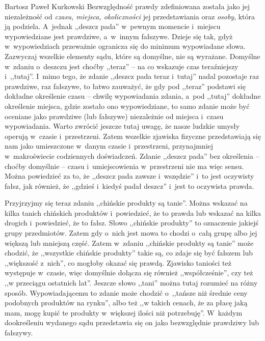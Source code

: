 \begin{artplenv}{Bartosz Paweł Kurkowski}
Bezwzględność prawdy zdefiniowana została jako jej niezależność od \textit{czasu, miejsca, okoliczności} jej
przedstawiania oraz \textit{osoby}, która ją podziela. A~jednak ,,deszcz pada'' w~pewnym momencie i~miejscu wypowiedziane
jest prawdziwe, a~w~innym fałszywe. Dzieje się tak, gdyż w~wypowiedziach przeważnie ogranicza się do minimum
wypowiadane słowa. Zazwyczaj wszelkie elementy sądu, które są domyślne, nie są wyrażane. Domyślne w~zdaniu o~deszczu
jest choćby ,,teraz'' -- na co wskazuje czas teraźniejszy i~,,tutaj''. I~mimo tego, że zdanie ,,deszcz pada teraz i~tutaj''
nadal pozostaje raz prawdziwe, raz fałszywe, to łatwo zauważyć, że gdy pod ,,teraz'' podstawi się dokładne określenie
czasu -- chwilę wypowiadania zdania, a~pod ,,tutaj'' dokładne określenie miejsca, gdzie zostało ono wypowiedziane, to samo
zdanie może być oceniane jako prawdziwe (lub fałszywe) niezależnie od miejsca i~czasu wypowiadania. Warto zwrócić
jeszcze tutaj uwagę, że nasze ludzkie umysły operują w~czasie i~przestrzeni. Zatem wszelkie zjawiska fizyczne
przedstawiają się nam jako umieszczone w~danym czasie i~przestrzeni, przynajmniej w~makroświecie codziennych
doświadczeń. Zdanie ,,deszcz pada'' bez określenia -- choćby domyślnie -- czasu i~umiejscowienia w~przestrzeni nie ma więc
sensu. Można powiedzieć za to, że ,,deszcz pada zawsze i~wszędzie'' i~to jest oczywisty fałsz, jak również, że ,,gdzieś
i~kiedyś padał deszcz'' i~jest to oczywista prawda.


Przyjrzyjmy się teraz zdaniu ,,chińskie produkty są tanie''. Można wskazać na kilka tanich chińskich
produktów i~powiedzieć, że to prawda lub wskazać na kilka drogich i~powiedzieć, że to fałsz. Słowo ,,chińskie produkty'' to
oznaczenie jakiejś grupy przedmiotów. Zatem gdy o~nich jest mowa to chodzi o~całą grupę albo jej większą lub mniejszą
część. Zatem w~zdaniu ,,chińskie produkty są tanie'' może chodzić, że ,,wszystkie chińskie produkty'' takie są, co zdaje
się być fałszem lub ,,większość z~nich'', co mogłoby okazać się prawdą. Zjawisko taniości też występuje w~czasie, więc
domyślnie dołącza się również ,,współcześnie'', czy też ,,w przeciągu ostatnich lat''. Jeszcze słowo ,,tani'' można tutaj
rozumieć na różny sposób. Wypowiadającemu to zdanie może chodzić o~,,tańsze niż średnie ceny podobnych produktów na
rynku'', albo też ,,w takich cenach, że za płacę jaką mam, mogę kupić te produkty w~większej ilości niż potrzebuję''.
W~każdym dookreśleniu wydanego sądu przedstawia się on jako bezwzględnie prawdziwy lub fałszywy.



\end{artplenv}
